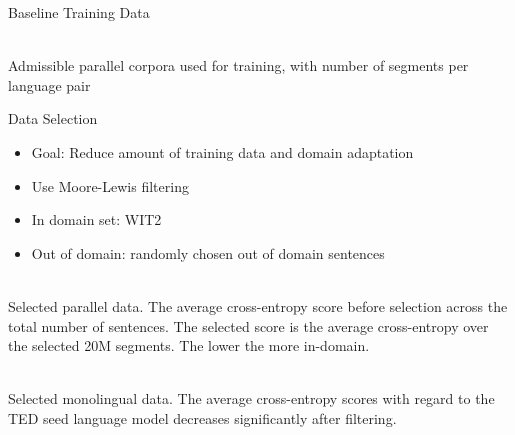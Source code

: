 \documentclass[20pt,final]{beamer}
\newcommand{\blockheading}[1]{\begin{center} \rule[-0.3cm]{0cm}{2.0cm} \Large #1 \vspace*{0.2cm} \end{center}}
\newcommand{\blockbegin}{\vspace{1em}\large}
\newcommand{\blockend}{\vspace*{0.2ex}}
\begin{document}
\begin{frame}{}
\begin{columns}[t]
\begin{column}{.45\linewidth}
\begin{block}{\blockheading{Baseline Training Data}}
\begin{center}
{{{     }
    }}
     \\
    \vskip 5mm
      Admissible parallel corpora used for training, with number of segments per language pair
    \end{center}


    \blockend
  \end{block}

    \vskip 50mm

  \begin{block}{\blockheading{Data Selection}}
    \blockbegin
    \begin{itemize}
      \item Goal: Reduce amount of training data and domain adaptation
      \item Use Moore-Lewis filtering
      \item In domain set: WIT2
      \item Out of domain: randomly chosen out of domain sentences
    \end{itemize}

   \begin{center}
     \\
    \vskip 5mm
Selected parallel data. The average cross-entropy score before selection across the total number of sentences. The selected score is the average cross-entropy over the selected 20M segments. The lower the more in-domain.
    \end{center}

   \begin{center}
     \\
    \vskip 5mm
      Selected monolingual data. The average cross-entropy scores with regard to the TED seed language model decreases significantly after filtering.
    \end{center}



\end{block}
\end{column}
\end{columns}
\end{frame}
\end{document}
